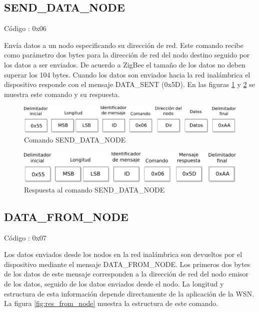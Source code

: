 \subsection{SEND\_DATA\_NODE}

Código : 0x06

Envía datos a un nodo especificando su dirección de red. Este comando recibe como parámetro dos bytes para la dirección de red del nodo destino seguido por los datos a ser enviados. De acuerdo a ZigBee el tamaño de los datos no deben superar los 104 bytes. Cuando los datos son enviados hacia la red inalámbrica el dispositivo responde con el mensaje DATA\_SENT (0x5D). En las figuras \ref{fig:cmd_send_node} y \ref{fig:res_send_node} se muestra este comando y su respuesta. 

\begin{figure}[h]
	\centering
	\includegraphics[scale=0.7]{capitulo_3_imgs/cmd_send_data.pdf}
	\caption{Comando SEND\_DATA\_NODE}
	\label{fig:cmd_send_node}
\end{figure}

\begin{figure}[h]
	\centering
	\includegraphics[scale=0.7]{capitulo_3_imgs/res_send_data.pdf}
	\caption{Respuesta al comando SEND\_DATA\_NODE}
	\label{fig:res_send_node}
\end{figure}

\subsection{DATA\_FROM\_NODE}

Código : 0x07

Los datos enviados desde los nodos en la red inalámbrica son devueltos por el dispositivo mediante el mensaje DATA\_FROM\_NODE. Los primeros dos bytes de los datos de este mensaje corresponden a la dirección de red del nodo emisor de los datos, seguido de los datos enviados desde el nodo. La longitud y estructura de esta información depende directamente de la aplicación de la WSN. La figura \ref{fig:res_from_node} muestra la estructura de este comando. 

